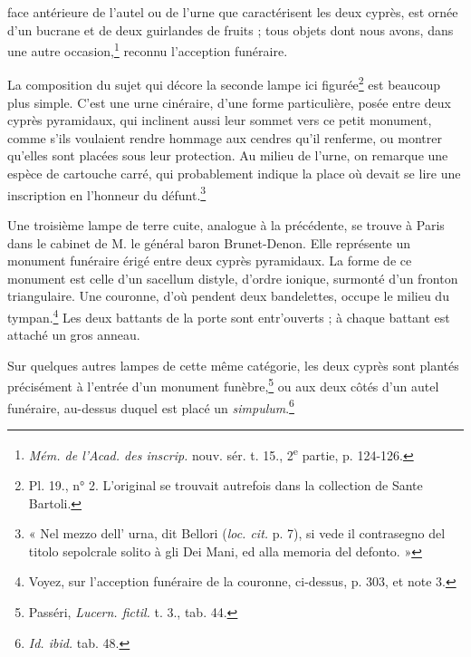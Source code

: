 \documentclass{article}
\begin{document}
face antérieure de l'autel ou de l'urne que caractérisent les deux cyprès, est ornée d'un bucrane et de deux guirlandes de fruits ; tous objets dont nous avons, dans une autre occasion,\footnote{\emph{Mém. de l'Acad. des inscrip.} nouv. sér. t. 15., 2\textsuperscript{e} partie, p. 124-126.} reconnu l'acception funéraire.

La composition du sujet qui décore la seconde lampe ici figurée\footnote{Pl. 19., n° 2. L'original se trouvait autrefois dans la collection de Sante Bartoli.} est beaucoup plus simple. C'est une urne cinéraire, d'une forme particulière, posée entre deux cyprès pyramidaux, qui inclinent aussi leur sommet vers ce petit monument, comme s'ils voulaient rendre hommage aux cendres qu'il renferme, ou montrer qu'elles sont placées sous leur protection. Au milieu de l'urne, on remarque une espèce de cartouche carré, qui probablement indique la place où devait se lire une inscription en l'honneur du défunt.\footnote{« Nel mezzo dell' urna, dit Bellori (\emph{loc. cit.} p. 7), si vede il contrasegno del titolo sepolcrale solito à gli Dei Mani, ed alla memoria del defonto. »}

Une troisième lampe de terre cuite, analogue à la précédente, se trouve à Paris dans le cabinet de M. le général baron Brunet-Denon. Elle représente un monument funéraire érigé entre deux cyprès pyramidaux. La forme de ce monument est celle d'un sacellum distyle, d'ordre ionique, surmonté d'un fronton triangulaire. Une couronne, d'où pendent deux bandelettes, occupe le milieu du tympan.\footnote{Voyez, sur l'acception funéraire de la couronne, ci-dessus, p. 303, et note 3.} Les deux battants de la porte sont entr'ouverts ; à chaque battant est attaché un gros anneau.

Sur quelques autres lampes de cette même catégorie, les deux cyprès sont plantés précisément à l'entrée d'un monument funèbre,\footnote{Passéri, \emph{Lucern. fictil.} t. 3., tab. 44.} ou aux deux côtés d'un autel funéraire, au-dessus duquel est placé un \emph{simpulum}.\footnote{\emph{Id. ibid.} tab. 48.}
\end{document}
